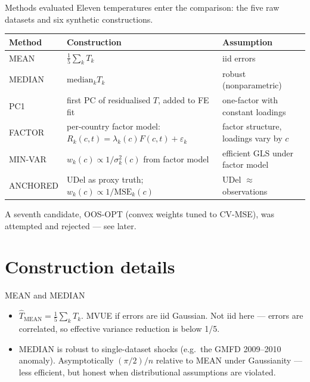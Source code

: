 \documentclass[10pt,aspectratio=169]{beamer}
\begin{document}
\begin{frame}{Methods evaluated}
  Eleven temperatures enter the comparison: the five raw datasets and six
  synthetic constructions.
  \vspace{0.4em}

  \small
  \begin{tabular}{lll}
    \toprule
    Method & Construction & Assumption \\
    \midrule
    MEAN      & $\tfrac{1}{5}\sum_k T_k$                       & iid errors \\
    MEDIAN    & $\text{median}_k T_k$                          & robust (nonparametric) \\
    PC1       & first PC of residualised $T$, added to FE fit  & one-factor with constant loadings \\
    FACTOR    & per-country factor model: $R_k(c,t)=\lambda_k(c)F(c,t)+\varepsilon_k$ & factor structure, loadings vary by $c$ \\
    MIN-VAR   & $w_k(c)\propto 1/\sigma_k^2(c)$ from factor model & efficient GLS under factor model \\
    ANCHORED  & UDel as proxy truth; $w_k(c)\propto 1/\text{MSE}_k(c)$ & UDel $\approx$ observations \\
    \bottomrule
  \end{tabular}

  \vspace{0.4em}
  \footnotesize
  A seventh candidate, OOS-OPT (convex weights tuned to CV-MSE), was
  attempted and rejected --- see later.
\end{frame}

\section{Construction details}

\begin{frame}{MEAN and MEDIAN}
  \begin{itemize}
    \item $\hat T_{\text{MEAN}} = \tfrac{1}{5}\sum_k T_k$. MVUE if errors are iid
          Gaussian. Not iid here --- errors are correlated, so effective
          variance reduction is below 1/5.
    \item MEDIAN is robust to single-dataset shocks (e.g.\ the GMFD
          2009--2010 anomaly). Asymptotically $(\pi/2)/n$ relative to MEAN
          under Gaussianity --- less efficient, but honest when
          distributional assumptions are violated.
  \end{itemize}
\end{frame}
\end{document}
